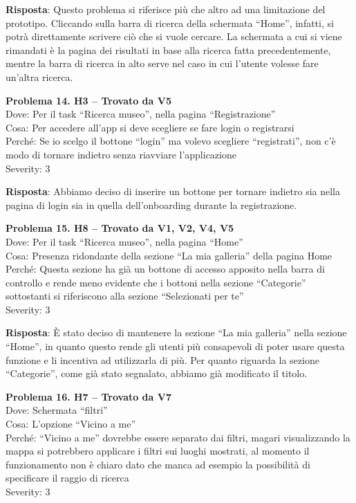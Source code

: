 \documentclass{article}
\begin{document}
\noindent \textbf{Risposta}: Questo problema si riferisce più che altro ad una limitazione del prototipo. Cliccando sulla barra di ricerca della schermata “Home”, infatti, si potrà direttamente scrivere ciò che si vuole cercare. La schermata a cui si viene rimandati è la pagina dei risultati in base alla ricerca fatta precedentemente, mentre la barra di ricerca in alto serve nel caso in cui l’utente volesse fare un’altra ricerca.

\noindent \textbf{Problema 14. H3 – Trovato da V5} \\
Dove: Per il task “Ricerca museo”, nella pagina “Registrazione” \\
Cosa: Per accedere all’app si deve scegliere se fare login o registrarsi \\
Perché: Se io scelgo il bottone “login” ma volevo scegliere “registrati”, non c’è modo di tornare indietro senza riavviare l’applicazione \\
Severity: 3

\noindent \textbf{Risposta}: Abbiamo deciso di inserire un bottone per tornare indietro sia nella pagina di login sia in quella dell’onboarding durante la registrazione.

\noindent \textbf{Problema 15. H8 – Trovato da V1, V2, V4, V5} \\
Dove: Per il task “Ricerca museo”, nella pagina “Home” \\
Cosa: Presenza ridondante della sezione “La mia galleria” della pagina Home \\
Perché: Questa sezione ha già un bottone di accesso apposito nella barra di controllo e rende meno evidente che i bottoni nella sezione “Categorie” sottostanti si riferiscono alla sezione “Selezionati per te” \\
Severity: 3  

\noindent \textbf{Risposta}: È stato deciso di mantenere la sezione “La mia galleria” nella sezione “Home”, in quanto questo rende gli utenti più consapevoli di poter usare questa funzione e li incentiva ad utilizzarla di più. Per quanto riguarda la sezione “Categorie”, come già stato segnalato, abbiamo già modificato il titolo.

\noindent \textbf{Problema 16. H7 – Trovato da V7} \\
Dove: Schermata “filtri” \\
Cosa: L’opzione “Vicino a me” \\
Perché: “Vicino a me” dovrebbe essere separato dai filtri, magari visualizzando la mappa si potrebbero applicare i filtri sui luoghi mostrati, al momento il funzionamento non è chiaro dato che manca ad esempio la possibilità di specificare il raggio di ricerca \\
Severity: 3
\end{document}
